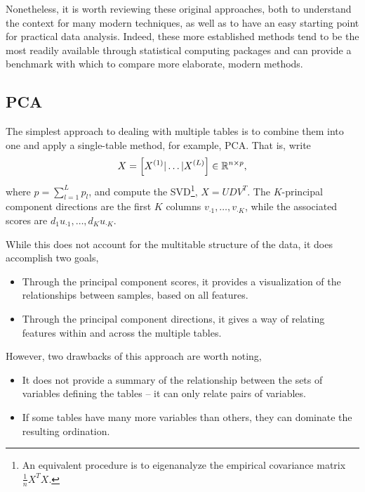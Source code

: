 \documentclass{article}
\begin{document}
Nonetheless, it is worth reviewing these original approaches, both to
understand the context for many modern techniques, as well as to have
an easy starting point for practical data analysis. Indeed, these more
established methods tend to be the most readily available through
statistical computing packages and can provide a benchmark with which
to compare more elaborate, modern methods.

\subsection{PCA}
\label{sec:pca}

The simplest approach to dealing with multiple tables is to combine
them into one and apply a single-table method, for example, PCA. That
is, write
\begin{align}
X = \left[X^{(1)} \vert \dots \vert X^{(L)}\right] \in \mathbb{R}^{n \times p},
\end{align}
where $p = \sum_{l = 1}^{L}p_{l}$, and compute the SVD\footnote{An
  equivalent procedure is to eigenanalyze the empirical covariance
  matrix $\frac{1}{n}X^{T}X$.}, $X = UDV^{T}$. The $K$-principal
component directions are the first $K$ columns $v_{\cdot 1}, \dots,
v_{\cdot K}$, while the associated scores are $d_{1}u_{\cdot 1},
\dots, d_{K}u_{\cdot K}$.

While this does not account for the multitable structure of the data,
it does accomplish two goals,
\begin{itemize}
\item Through the principal component scores, it provides a
  visualization of the relationships between
  samples, based on all features.
\item Through the principal component directions, it gives a way of
  relating features within and across the multiple tables.
\end{itemize}

However, two drawbacks of this approach are worth noting,
\begin{itemize}
  \item It does not provide a summary of the relationship between the
    sets of variables defining the tables -- it can only relate pairs
    of variables. \label{bullet:pca_drawback_one}
  \item If some tables have many more variables than others, they can
    dominate the resulting ordination. \label{bullet:pca_drawback_two}
\end{itemize}
\end{document}
